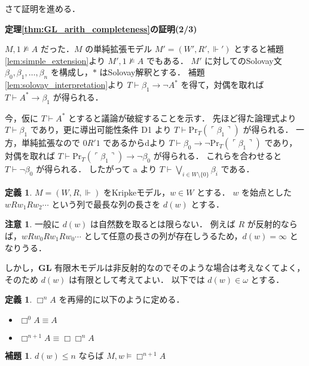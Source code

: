 \documentclass{jsarticle}
\makeatletter
\newcommand*{\Logic}[1]{\mathbf{#1}}
\newcommand*{\LogicGL}{\Logic{GL}}
\newcommand*{\Provable}{\mathrm{Pr}}
\theoremstyle{definition}
\newtheorem{lemma}[theorem]{補題}
\newtheorem{definition}[theorem]{定義}
\newtheorem{remark}[theorem]{注意}
\renewcommand{\proofname}{証明}
\renewenvironment{proof}[1][\proofname]{\par
    \normalfont 
    \topsep6\p@\@plus6\p@\relax
    \trivlist
    \item\relax
    {\bfseries\gtfamily
    #1\@addpunct{.}}\hspace\labelsep\ignorespaces
    }{%
    \endtrivlist
    \@endpefalse
}
\makeatother
\begin{document}
さて証明を進める．

\begin{proof}[定理\ref{thm:GL_arith_completeness}の証明(2/3)]
    $M,1 \nvDash A$ だった．$M$ の単純拡張モデル $M' = (W', R', \Vdash')$ とすると補題\ref{lem:simple_extension}より $M',1 \nvDash A$ でもある．
    $M'$ に対してのSolovay文 $\beta_0, \beta_1, \dots, \beta_n$ を構成し，$*$ はSolovay解釈とする．
    補題\ref{lem:solovay_interpretation}より $T \vdash \beta_1 \to \lnot A^*$ を得て，対偶を取れば $T \vdash A^* \to \beta_1$ が得られる．

    今，仮に $T \vdash A^*$ とすると議論が破綻することを示す．
    先ほど得た論理式より $T \vdash \beta_1$ であり，更に導出可能性条件 D1 より $T \vdash \Provable_T(\ulcorner \beta_1 \urcorner)$ が得られる．
    一方，単純拡張なので $0 R' 1$ であるからdより $T \vdash \beta_0 \to \lnot \Provable_T(\ulcorner \beta_1 \urcorner)$ であり，
    対偶を取れば $T \vdash \Provable_T(\ulcorner \beta_1 \urcorner) \to \lnot \beta_0$ が得られる．
    これらを合わせると $T \vdash \lnot \beta_0$ が得られる．
    したがって a より $T \vdash \bigvee_{i \in W \setminus \{0\}} \beta_i$ である．
\end{proof}

\begin{definition}
    $M = (W, R, \Vdash)$ をKripkeモデル，$w \in W$ とする．
    $w$ を始点とした $w R w_1 R w_2 \cdots$ という列で最長な列の長さを $d(w)$ とする．
\end{definition}

\begin{remark}
    一般に $d(w)$ は自然数を取るとは限らない．
    例えば $R$ が反射的ならば，$w R w_0 R w_1 R w_0 \cdots$ として任意の長さの列が存在しうるため，$d(w) = \infty$ となりうる．

    しかし，$\LogicGL$ 有限木モデルは非反射的なのでそのような場合は考えなくてよく，そのため $d(w)$ は有限として考えてよい．
    以下では $d(w) \in \omega$ とする．
\end{remark}

\begin{definition}
    $\Box^n A$ を再帰的に以下のように定める．
    \begin{itemize}
        \item $\Box^0 A \equiv A$
        \item $\Box^{n+1} A \equiv \Box \Box^n A$
    \end{itemize}
\end{definition}

\begin{lemma}\label{lem:cannot_access}
    $d(w) \leq n$ ならば $M,w \vDash \Box^{n + 1} A$
\end{lemma}
\end{document}
